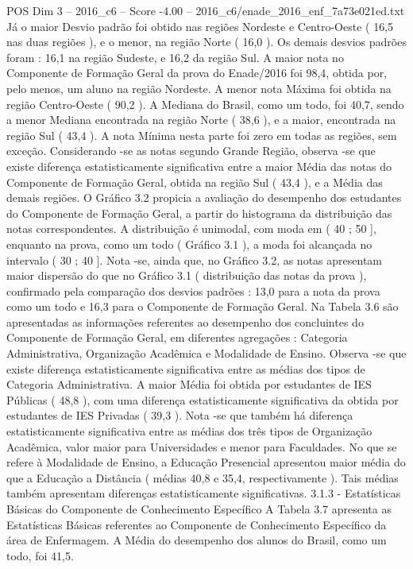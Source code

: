 \begin{textsample}{POS Dim 3 – 2016\_c6 – Score -4.00 – 2016\_c6/enade\_2016\_enf\_7a73e021ed.txt}
Já o maior Desvio padrão foi obtido nas regiões Nordeste e Centro-Oeste ( 16,5 nas duas regiões ), e o menor, na região Norte ( 16,0 ).
Os demais desvios padrões foram : 16,1 na região Sudeste, e 16,2 da região Sul.
A maior nota no Componente de Formação Geral da prova do Enade/2016 foi 98,4, obtida por, pelo menos, um aluno na região Nordeste.
A menor nota Máxima foi obtida na região Centro-Oeste ( 90,2 ).
A Mediana do Brasil, como um todo, foi 40,7, sendo a menor Mediana encontrada na região Norte ( 38,6 ), e a maior, encontrada na região Sul ( 43,4 ).
A nota Mínima nesta parte foi zero em todas as regiões, sem exceção.
Considerando -se as notas segundo Grande Região, observa -se que existe diferença estatisticamente significativa entre a maior Média das notas do Componente de Formação Geral, obtida na região Sul ( 43,4 ), e a Média das demais regiões.
O Gráfico 3.2 propicia a avaliação do desempenho dos estudantes do Componente de Formação Geral, a partir do histograma da distribuição das notas correspondentes.
A distribuição é unimodal, com moda em ( 40 ; 50 ], enquanto na prova, como um todo ( Gráfico 3.1 ), a moda foi alcançada no intervalo ( 30 ; 40 ].
Nota -se, ainda que, no Gráfico 3.2, as notas apresentam maior dispersão do que no Gráfico 3.1 ( distribuição das notas da prova ), confirmado pela comparação dos desvios padrões : 13,0 para a nota da prova como um todo e 16,3 para o Componente de Formação Geral.
Na Tabela 3.6 são apresentadas as informações referentes ao desempenho dos concluintes do Componente de Formação Geral, em diferentes agregações : Categoria Administrativa, Organização Acadêmica e Modalidade de Ensino.
Observa -se que existe diferença estatisticamente significativa entre as médias dos tipos de Categoria Administrativa.
A maior Média foi obtida por estudantes de IES Públicas ( 48,8 ), com uma diferença estatisticamente significativa da obtida por estudantes de IES Privadas ( 39,3 ).
Nota -se que também há diferença estatisticamente significativa entre as médias dos três tipos de Organização Acadêmica, valor maior para Universidades e menor para Faculdades.
No que se refere à Modalidade de Ensino, a Educação Presencial apresentou maior média do que a Educação a Distância ( médias 40,8 e 35,4, respectivamente ).
Tais médias também apresentam diferenças estatisticamente significativas. 3.1.3 - Estatísticas Básicas do Componente de Conhecimento Específico A Tabela 3.7 apresenta as Estatísticas Básicas referentes ao Componente de Conhecimento Específico da área de Enfermagem.
A Média do desempenho dos alunos do Brasil, como um todo, foi 41,5.

\end{textsample}
